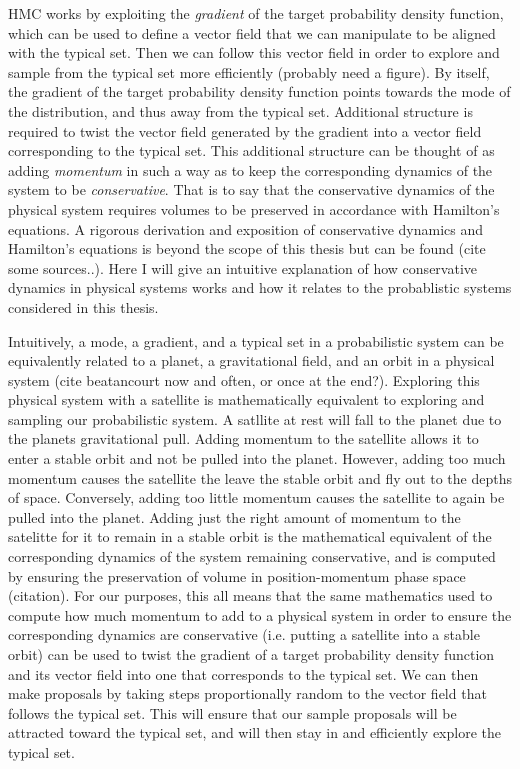 HMC works by exploiting the \textit{gradient} of the target probability density function, which can be used to define a vector field that we can manipulate to be aligned with the typical set. Then we can follow this vector field in order to explore and sample from the typical set more efficiently (probably need a figure). By itself, the gradient of the target probability density function points towards the mode of the distribution, and thus away from the typical set. Additional structure is required to twist the vector field generated by the gradient into a vector field corresponding to the typical set. This additional structure can be thought of as adding \textit{momentum} in such a way as to keep the corresponding dynamics of the system to be \textit{conservative}. That is to say that the conservative dynamics of the physical system requires volumes to be preserved in accordance with Hamilton's equations. A rigorous derivation and exposition of conservative dynamics and Hamilton's equations is beyond the scope of this thesis but can be found (cite some sources..). Here I will give an intuitive explanation of how conservative dynamics in physical systems works and how it relates to the probablistic systems considered in this thesis.

Intuitively, a mode, a gradient, and a typical set in a probabilistic system can be equivalently related to a planet, a gravitational field, and an orbit in a physical system (cite beatancourt now and often, or once at the end?). Exploring this physical system with a satellite is mathematically equivalent to exploring and sampling our probabilistic system. A satllite at rest will fall to the planet due to the planets gravitational pull. Adding momentum to the satellite allows it to enter a stable orbit and not be pulled into the planet. However, adding too much momentum causes the satellite the leave the stable orbit and fly out to the depths of space. Conversely, adding too little momentum causes the satellite to again be pulled into the planet. Adding just the right amount of momentum to the satelitte for it to remain in a stable orbit is the mathematical equivalent of the corresponding dynamics of the system remaining conservative, and is computed by ensuring the preservation of volume in position-momentum phase space (citation). For our purposes, this all means that the same mathematics used to compute how much momentum to add to a physical system in order to ensure the corresponding dynamics are conservative (i.e. putting a satellite into a stable orbit) can be used to twist the gradient of a target probability density function and its vector field into one that corresponds to the typical set. We can then make proposals by taking steps proportionally random to the vector field that follows the typical set. This will ensure that our sample proposals will be attracted toward the typical set, and will then stay in and efficiently explore the typical set.
